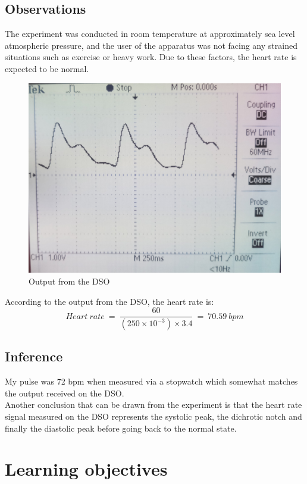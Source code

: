 \documentclass[12pt]{article}
\begin{document}
\begin{multicols}{2}
\subsection{Observations}

The experiment was conducted in room temperature at approximately sea level atmospheric pressure, and the user of the apparatus was not facing any strained situations such as exercise or heavy work. Due to these factors, the heart rate is expected to be normal. 

\begin{figure}[H]
    \centering
    \includegraphics[width = 0.9\linewidth]{DSO_Output.jpg}
    \caption{Output from the DSO}
\end{figure}

According to the output from the DSO, the heart rate is:
\[Heart\ rate\ =\ \frac{60}{\left(250\times10^{-3}\right)\times3.4}\ =\ 70.59\ bpm\]

\subsection{Inference}

My pulse was 72 bpm when measured via a stopwatch which somewhat matches the output received on the DSO.\\
Another conclusion that can be drawn from the experiment is that the heart rate signal measured on the DSO represents the systolic peak, the dichrotic notch and finally the diastolic peak before going back to the normal state.

\section{Learning objectives}


\end{multicols}
\end{document}
